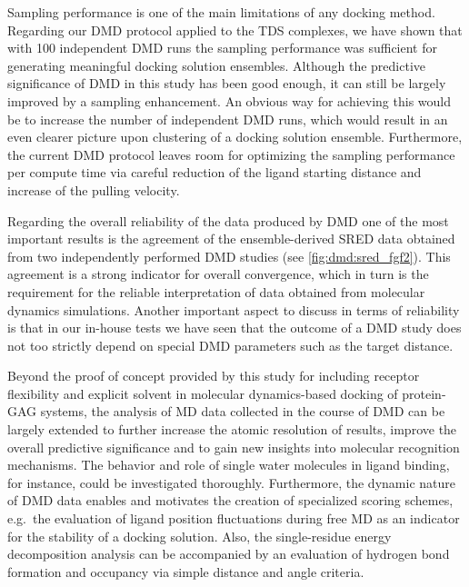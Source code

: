 Sampling performance is one of the main limitations of any docking method.
Regarding our DMD protocol applied to the TDS complexes, we have shown that with
100 independent DMD runs the sampling performance was sufficient for generating
meaningful docking solution ensembles. Although the predictive significance of
DMD in this study has been good enough, it can still be largely improved by a
sampling enhancement. An obvious way for achieving this would be to increase the
number of independent DMD runs, which would result in an even clearer picture
upon clustering of a docking solution ensemble. Furthermore, the current DMD
protocol leaves room for optimizing the sampling performance per compute time
via careful reduction of the ligand starting distance and increase of the
pulling velocity.

Regarding the overall reliability of the data produced by DMD one of the most
important results is the agreement of the ensemble-derived SRED data obtained
from two independently performed DMD studies (see \cref{fig:dmd:sred_fgf2}).
This agreement is a strong indicator for overall convergence, which in turn
is the requirement for the reliable interpretation of data obtained from
molecular dynamics simulations. Another important aspect to discuss in terms
of reliability is that in our in-house tests we have seen that the outcome
of a DMD study does not too strictly depend on special DMD parameters such as
the target distance.

Beyond the proof of concept provided by this study for including receptor
flexibility and explicit solvent in molecular dynamics-based docking of protein-
GAG systems, the analysis of MD data collected in the course of DMD can be
largely extended to further increase the atomic resolution of results, improve
the overall predictive significance and to gain new insights into molecular
recognition mechanisms. The behavior and role of single water molecules in
ligand binding, for instance, could be investigated thoroughly. Furthermore, the
dynamic nature of DMD data enables and motivates the creation of specialized
scoring schemes, e.g.\ the evaluation of ligand position fluctuations during
free MD as an indicator for the stability of a docking solution. Also, the
single-residue energy decomposition analysis can be accompanied by an evaluation
of hydrogen bond formation and occupancy via simple distance and angle criteria.

